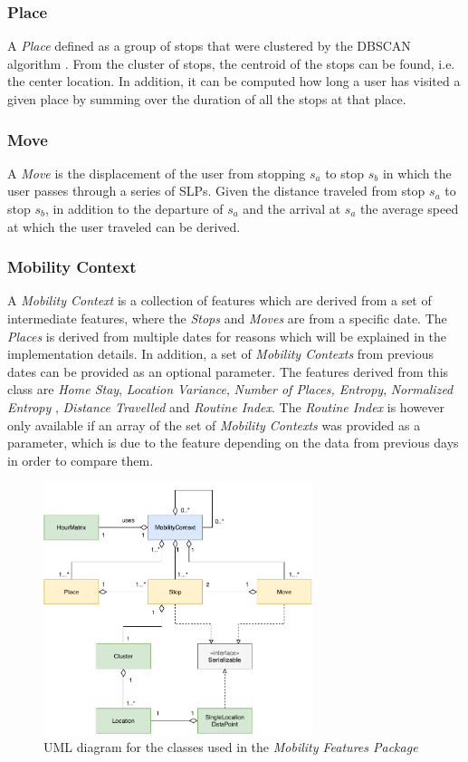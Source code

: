 \subsubsection*{Place}
A \textit{Place} defined as a group of stops that were clustered by the DBSCAN algorithm \cite{density-based-1996}. From the cluster of stops, the centroid of the stops can be found, i.e. the center location. In addition, it can be computed how long a user has visited a given place by summing over the duration of all the stops at that place.

\subsubsection*{Move}
A \textit{Move} is the displacement of the user from stopping $s_a$ to stop $s_b$ in which the user passes through a series of SLPs. Given the distance traveled from stop $s_a$ to stop $s_b$, in addition to the departure of $s_a$ and the arrival at $s_a$ the average speed at which the user traveled can be derived. 

\subsubsection*{Mobility Context}
A \textit{Mobility Context} is a collection of features which are derived from a set of intermediate features, where the \textit{Stops} and \textit{Moves} are from a specific date. The \textit{Places} is derived from multiple dates for reasons which will be explained in the implementation details. In addition, a set of \textit{Mobility Contexts }from previous dates can be provided as an optional parameter. The features derived from this class are \textit{Home Stay}, \textit{Location Variance}, \textit{Number of Places, Entropy}, \textit{Normalized Entropy} , \textit{Distance Travelled} and \textit{Routine Index}. The \textit{Routine Index} is however only available if an array of the set of \textit{Mobility Contexts} was provided as a parameter, which is due to the feature depending on the data from previous days in order to compare them.

\begin{figure}[h]
    \centering
    \includegraphics[width=0.7\textwidth]{./images/uml-mobility.pdf}
    \caption{UML diagram for the classes used in the \textit{Mobility Features Package}}
    \label{fig:my_label}
\end{figure}


